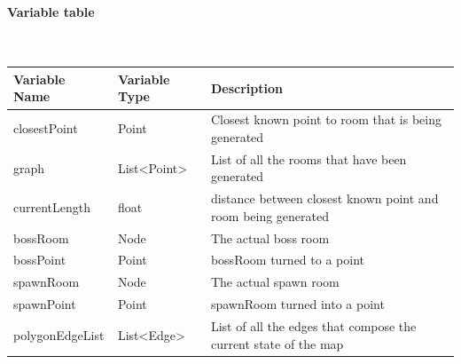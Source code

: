 \documentclass{article}
\newcommand{\myparagraph}[1]{\paragraph{#1}\mbox{}\\} %
\newcommand{\smallBr}{\vspace{1.5mm}}
\begin{document}
\myparagraph{Variable table}
\smallBr
\begin{tabular}{l|l|l}
Variable Name   & Variable Type                      & Description                                                     \\ \hline
closestPoint    & Point                              & Closest known point to room that is being generated             \\
graph           & List\textless{}Point\textgreater{} & List of all the rooms that have been generated                  \\
currentLength   & float                              & distance between closest known point and room being generated   \\
bossRoom        & Node                               & The actual boss room                                            \\
bossPoint       & Point                              & bossRoom turned to a point                                      \\
spawnRoom       & Node                               & The actual spawn room                                           \\
spawnPoint      & Point                              & spawnRoom turned into a point                                   \\
polygonEdgeList & List\textless{}Edge\textgreater{}  & List of all the edges that compose the current state of the map
\end{tabular}
\end{document}
